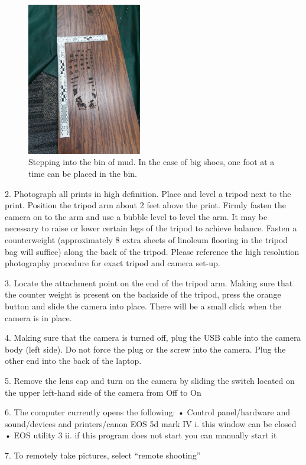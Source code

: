 \begin{figure}[!htp]
\centering
\includegraphics[width=5cm]{Mud_Scale}
\caption{Stepping into the bin of mud. In the case of big shoes, one foot at a time can be placed in the bin. }
\label{Image 4}
\end{figure}

2. Photograph all prints in high definition. Place and level a tripod next to the print. Position the tripod arm about 2 feet above the print. Firmly fasten the camera on to the arm and use a bubble level to level  the arm. It may be necessary to raise or lower certain legs of the tripod to achieve balance. Fasten a counterweight (approximately 8 extra sheets of linoleum flooring in the tripod bag will suffice) along the back of the tripod. Please reference the high resolution photography procedure for exact tripod and camera set-up. 

3.  Locate the attachment point on the end of the tripod arm. Making sure that the counter weight is present on the backside of the tripod, press the orange button and slide the camera into place. There will be a small click when the camera is in place. 

4. Making sure that the camera is turned off, plug the USB cable into the camera body (left side). Do not force the plug or the screw into the camera. Plug the other end into the back of the laptop. 

5. Remove the lens cap and turn on the camera by sliding the switch located on the upper left-hand side of the camera from Off to On

6. The computer currently opens the following:
•	Control panel/hardware and sound/devices and printers/canon EOS 5d mark IV
i.	this window can be closed
•	EOS utility 3
ii.	if this program does not start you can manually start it

7. To remotely take pictures, select “remote shooting”

